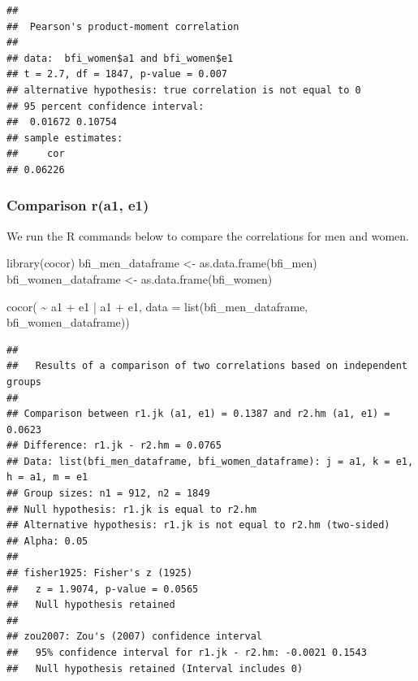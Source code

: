 \documentclass[
]{krantz}
\makeatletter
\newenvironment{Shaded}{\begin{snugshade}}{\end{snugshade}}
\newcommand{\AttributeTok}[1]{\textcolor[rgb]{0.61,0.61,0.61}{#1}}
\newcommand{\FunctionTok}[1]{\textcolor[rgb]{0,0,0}{#1}}
\newcommand{\NormalTok}[1]{#1}
\newcommand{\OtherTok}[1]{\textcolor[rgb]{0.37,0.37,0.37}{#1}}
\newcommand{\SpecialCharTok}[1]{\textcolor[rgb]{0,0,0}{#1}}
\newenvironment{kframe}{%
\medskip{}
\setlength{\fboxsep}{.8em}
 \def\at@end@of@kframe{}%
 \ifinner\ifhmode%
  \def\at@end@of@kframe{\end{minipage}}%
  \begin{minipage}{\columnwidth}%
 \fi\fi%
 \def\FrameCommand##1{\hskip\@totalleftmargin \hskip-\fboxsep
 \colorbox{shadecolor}{##1}\hskip-\fboxsep
     \hskip-\linewidth \hskip-\@totalleftmargin \hskip\columnwidth}%
 \MakeFramed {\advance\hsize-\width
   \@totalleftmargin\z@ \linewidth\hsize
   \@setminipage}}%
 {\par\unskip\endMakeFramed%
 \at@end@of@kframe}
\renewenvironment{Shaded}{\begin{kframe}}{\end{kframe}}
\makeatother
\begin{document}
\begin{Shaded}
\end{Shaded}

\begin{verbatim}
## 
##  Pearson's product-moment correlation
## 
## data:  bfi_women$a1 and bfi_women$e1
## t = 2.7, df = 1847, p-value = 0.007
## alternative hypothesis: true correlation is not equal to 0
## 95 percent confidence interval:
##  0.01672 0.10754
## sample estimates:
##     cor 
## 0.06226
\end{verbatim}

\hypertarget{comparison-ra1-e1}{%
\subsubsection{Comparison r(a1, e1)}\label{comparison-ra1-e1}}

We run the R commands below to compare the correlations for men and women.

\begin{Shaded}
\begin{Highlighting}[]
\FunctionTok{library}\NormalTok{(cocor)}
\NormalTok{bfi\_men\_dataframe   }\OtherTok{\textless{}{-}} \FunctionTok{as.data.frame}\NormalTok{(bfi\_men)}
\NormalTok{bfi\_women\_dataframe }\OtherTok{\textless{}{-}} \FunctionTok{as.data.frame}\NormalTok{(bfi\_women)}

\FunctionTok{cocor}\NormalTok{( }\SpecialCharTok{\textasciitilde{}}\NormalTok{ a1 }\SpecialCharTok{+}\NormalTok{ e1 }\SpecialCharTok{|}\NormalTok{ a1 }\SpecialCharTok{+}\NormalTok{ e1,}
       \AttributeTok{data =} \FunctionTok{list}\NormalTok{(bfi\_men\_dataframe, bfi\_women\_dataframe))}
\end{Highlighting}
\end{Shaded}

\begin{verbatim}
## 
##   Results of a comparison of two correlations based on independent groups
## 
## Comparison between r1.jk (a1, e1) = 0.1387 and r2.hm (a1, e1) = 0.0623
## Difference: r1.jk - r2.hm = 0.0765
## Data: list(bfi_men_dataframe, bfi_women_dataframe): j = a1, k = e1, h = a1, m = e1
## Group sizes: n1 = 912, n2 = 1849
## Null hypothesis: r1.jk is equal to r2.hm
## Alternative hypothesis: r1.jk is not equal to r2.hm (two-sided)
## Alpha: 0.05
## 
## fisher1925: Fisher's z (1925)
##   z = 1.9074, p-value = 0.0565
##   Null hypothesis retained
## 
## zou2007: Zou's (2007) confidence interval
##   95% confidence interval for r1.jk - r2.hm: -0.0021 0.1543
##   Null hypothesis retained (Interval includes 0)
\end{verbatim}
\end{document}

